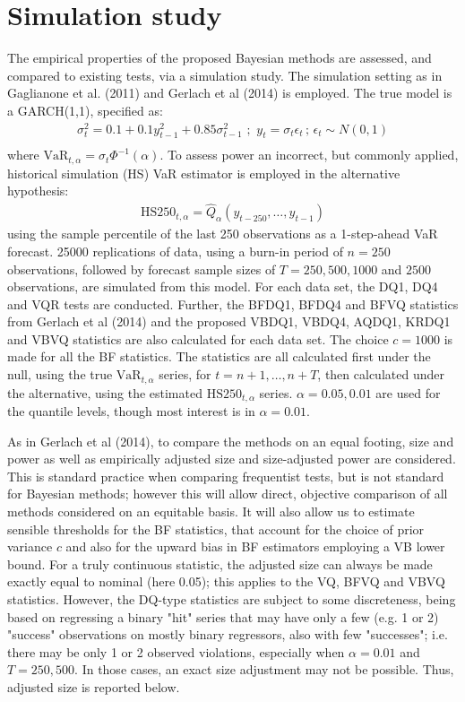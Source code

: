 \documentclass[12pt,epsf]{article}
\begin{document}
\section{Simulation study}
The empirical properties of the proposed Bayesian methods are assessed, and compared to existing tests, via a simulation study.
The simulation setting as in Gaglianone et al. (2011) and Gerlach et al (2014) is employed. The true model is a GARCH(1,1), specified as:
\begin{eqnarray*}
\sigma_t^2 = 0.1 + 0.1y_{t-1}^2 + 0.85\sigma_{t-1}^2 \,\,;\,\, y_t = \sigma_t \epsilon_t \,;\, \epsilon_t \sim N(0,1) \\
\end{eqnarray*}
where $\mbox{VaR}_{t,\alpha} = \sigma_t \Phi^{-1}(\alpha)$. To assess power an incorrect, but commonly applied, historical simulation (HS)
VaR estimator is employed in the alternative hypothesis:
\begin{eqnarray*}
\mbox{HS}250_{t,\alpha} = \hat{Q}_{\alpha}(y_{t-250},\ldots,y_{t-1})
\end{eqnarray*}
using the sample percentile of the last 250 observations as a 1-step-ahead VaR forecast. 25000 replications of data, using a burn-in period of
$n=250$ observations, followed by forecast sample sizes of $T=250, 500, 1000$ and $2500$ observations, are simulated from this model.
For each data set, the DQ1, DQ4 and VQR tests are conducted. Further, the BFDQ1, BFDQ4 and BFVQ statistics from Gerlach et al (2014) and
the proposed VBDQ1, VBDQ4, AQDQ1, KRDQ1 and VBVQ statistics are also calculated for each data set. The choice $c=1000$ is made for all
the BF statistics. The statistics are all calculated first under the null, using the true $\mbox{VaR}_{t,\alpha}$ series,
for $t=n+1,\ldots,n+T$, then calculated under the alternative, using the estimated $\mbox{HS}250_{t,\alpha}$ series.
$\alpha=0.05, 0.01$ are used for the quantile levels, though most interest is in $\alpha=0.01$.

As in Gerlach et al (2014), to compare the methods on an equal footing, size and power as well as empirically adjusted
size and size-adjusted power are considered. This is standard practice when comparing frequentist tests, but is not standard for Bayesian
methods; however this will allow direct, objective comparison of all methods considered on an equitable basis. It will also
allow us to estimate sensible thresholds for the BF statistics, that account for the choice of prior variance $c$ and also for
the upward bias in BF estimators employing a VB lower bound. For a truly continuous statistic, the adjusted size can always be made
exactly equal to nominal (here 0.05); this applies to the VQ, BFVQ and VBVQ statistics. However, the DQ-type statistics are subject
to some discreteness, being based on regressing a binary "hit" series that may have only a few (e.g. 1 or 2) "success" observations on
mostly binary regressors, also with few "successes"; i.e. there may be only 1 or 2 observed violations, especially when $\alpha=0.01$ and
$T=250, 500$. In those cases, an exact size adjustment may not be possible. Thus, adjusted size is reported below.
\end{document}

